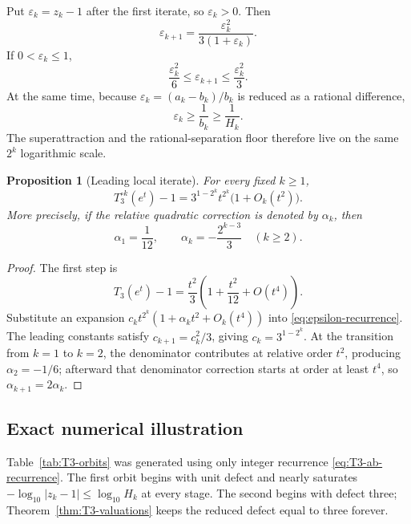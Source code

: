 \documentclass[11pt,oneside]{article}
\newtheorem{proposition}[theorem]{Proposition}
\theoremstyle{definition}
\theoremstyle{remark}
\begin{document}
Put \(\varepsilon_k=z_k-1\) after the first iterate, so \(\varepsilon_k>0\).  Then
\begin{equation}
 \varepsilon_{k+1}=\frac{\varepsilon_k^2}{3(1+\varepsilon_k)}.
 \label{eq:epsilon-recurrence}
\end{equation}
If \(0<\varepsilon_k\le1\),
\begin{equation}
 \frac{\varepsilon_k^2}{6}
 \le\varepsilon_{k+1}\le
 \frac{\varepsilon_k^2}{3}.
 \label{eq:epsilon-bounds}
\end{equation}
At the same time, because \(\varepsilon_k=(a_k-b_k)/b_k\) is reduced as a rational
difference,
\begin{equation}
 \varepsilon_k\ge\frac1{b_k}\ge\frac1{H_k}.
 \label{eq:rational-separation}
\end{equation}
The superattraction and the rational-separation floor therefore live on the same \(2^k\)
logarithmic scale.

\begin{proposition}[Leading local iterate]
\label{prop:T3-local-iterate}
For every fixed \(k\ge1\),
\begin{equation}
 T_3^{\circ k}(e^t)-1
 =3^{1-2^k}t^{2^k}\bigl(1+O_k(t^2)\bigr).
 \label{eq:T3-local-iterate}
\end{equation}
More precisely, if the relative quadratic correction is denoted by \(\alpha_k\), then
\begin{equation}
 \alpha_1=\frac1{12},
 \qquad
 \alpha_k=-\frac{2^{k-3}}3\quad(k\ge2).
 \label{eq:alpha-k}
\end{equation}
\end{proposition}

\begin{proof}
The first step is
\[
 T_3(e^t)-1=\frac{t^2}{3}\left(1+\frac{t^2}{12}+O(t^4)\right).
\]
Substitute an expansion \(c_kt^{2^k}(1+\alpha_kt^2+O_k(t^4))\) into
\eqref{eq:epsilon-recurrence}.  The leading constants satisfy
\(c_{k+1}=c_k^2/3\), giving \(c_k=3^{1-2^k}\).  At the transition from \(k=1\) to
\(k=2\), the denominator contributes at relative order \(t^2\), producing
\(\alpha_2=-1/6\); afterward that denominator correction starts at order at least \(t^4\),
so \(\alpha_{k+1}=2\alpha_k\).
\end{proof}

\subsection{Exact numerical illustration}

Table~\ref{tab:T3-orbits} was generated using only integer recurrence
\eqref{eq:T3-ab-recurrence}.  The first orbit begins with unit defect and nearly saturates
\(-\log_{10}|z_k-1|\le\log_{10}H_k\) at every stage.  The second begins with defect three;
Theorem~\ref{thm:T3-valuations} keeps the reduced defect equal to three forever.
\end{document}
